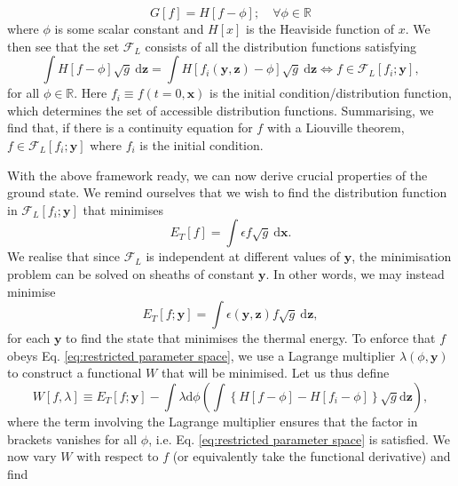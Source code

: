 \begin{equation}
    G[f] = H[f-\phi]; \quad \forall \phi \in \mathbb{R}
    \label{eq: casimir inv.}
\end{equation}
where $\phi$ is some scalar constant and $H[x]$ is the Heaviside function of $x$. We then see that the set $\mathcal{F}_L$ consists of all the distribution functions satisfying
\begin{equation}
    \int H[f - \phi]  \sqrt{g} \: \mathrm{d} \boldsymbol{z} = \int H[f_i(\boldsymbol{y},\boldsymbol{z})-\phi] \sqrt{g} \: \mathrm{d} \boldsymbol{z} \iff f \in \mathcal{F}_L[f_i;\boldsymbol{y}],
    \label{eq:restricted parameter space}
\end{equation}
for all $\phi \in \mathbb{R}$. Here $f_i\equiv f(t=0,\boldsymbol{x})$ is the initial condition/distribution function, which determines the set of accessible distribution functions. Summarising, we find that, if there is a continuity equation for $f$ with a Liouville theorem, $f \in \mathcal{F}_L[f_i;\boldsymbol{y}]$ where $f_i$ is the initial condition. \par 
With the above framework ready, we can now derive crucial properties of the ground state. We remind ourselves that we wish to find the distribution function in $\mathcal{F}_L[f_i;\boldsymbol{y}]$ that minimises
\begin{equation}
    E_T[f] = \int \epsilon f \sqrt{g} \: \mathrm{d} \boldsymbol{x}.
\end{equation}
We realise that since $\mathcal{F}_L$ is independent at different values of $\boldsymbol{y}$, the minimisation problem can be solved on sheaths of constant $\boldsymbol{y}$. In other words, we may instead minimise
\begin{equation}
    E_T[f;\boldsymbol{y}]= \int \epsilon(\boldsymbol{y},\boldsymbol{z}) f \sqrt{g} \: \mathrm{d}\boldsymbol{z},
\end{equation}
for each $\boldsymbol{y}$ to find the state that minimises the thermal energy. To enforce that $f$ obeys Eq. \eqref{eq:restricted parameter space}, we use a Lagrange multiplier $\lambda(\phi,\boldsymbol{y})$ to construct a functional $W$ that will be minimised. Let us thus define
\begin{equation}
    W[f,\lambda] \equiv E_T[f;\boldsymbol{y}] - \int \lambda\mathrm{d} \phi \left( \int \left\{ H[f - \phi]- H[f_i - \phi] \right\}\sqrt{g}  \mathrm{d} \boldsymbol{z} \right),
\end{equation}
where the term involving the Lagrange multiplier ensures that the factor in brackets vanishes for all $\phi$, i.e. Eq. \eqref{eq:restricted parameter space} is satisfied. We now vary $W$ with respect to $f$ (or equivalently take the functional derivative) and find
